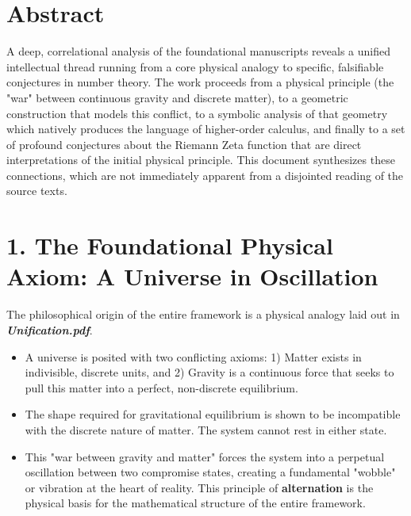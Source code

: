 \section*{Abstract}
A deep, correlational analysis of the foundational manuscripts reveals a unified intellectual thread running from a core physical analogy to specific, falsifiable conjectures in number theory. The work proceeds from a physical principle (the "war" between continuous gravity and discrete matter), to a geometric construction that models this conflict, to a symbolic analysis of that geometry which natively produces the language of higher-order calculus, and finally to a set of profound conjectures about the Riemann Zeta function that are direct interpretations of the initial physical principle. This document synthesizes these connections, which are not immediately apparent from a disjointed reading of the source texts.

\section*{1. The Foundational Physical Axiom: A Universe in Oscillation}
The philosophical origin of the entire framework is a physical analogy laid out in \textbf{\textit{Unification.pdf}}.
\begin{itemize}
    \item A universe is posited with two conflicting axioms: 1) Matter exists in indivisible, discrete units, and 2) Gravity is a continuous force that seeks to pull this matter into a perfect, non-discrete equilibrium.
    \item The shape required for gravitational equilibrium is shown to be incompatible with the discrete nature of matter. The system cannot rest in either state.
    \item This "war between gravity and matter" forces the system into a perpetual oscillation between two compromise states, creating a fundamental "wobble" or vibration at the heart of reality. This principle of \textbf{alternation} is the physical basis for the mathematical structure of the entire framework.
\end{itemize}

